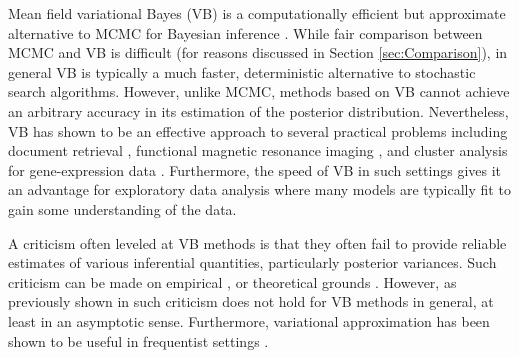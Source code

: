 \documentclass[11pt]{article}
\newtheorem{Main Result}{Main Result}
\newcommand{\joc}[1]{{\color{black}#1}}
\begin{document}
Mean field variational Bayes (VB) is \joc{a computationally efficient} but 
approximate alternative to MCMC for Bayesian inference 
\citep{Bishop2006,Ormerod2010}. While fair comparison between MCMC and VB is 
difficult (for reasons discussed in Section \ref{sec:Comparison}), in general VB 
is typically a much faster, deterministic alternative to stochastic search 
algorithms. However, unlike MCMC, methods based on VB cannot achieve an arbitrary 
accuracy \joc{in its estimation of the posterior distribution}. Nevertheless, VB 
has shown to be an effective approach to several practical problems including 
document retrieval \citep{Jordan2004}, functional magnetic resonance imaging 
\citep{FlandinPenny2007,NathooEtal2014}, and cluster analysis for 
gene-expression data \citep{TeschendorffEtal2005}. Furthermore, the speed of VB 
in such settings gives it an advantage for exploratory data analysis where many 
models are typically fit to gain some understanding of the data.


A criticism often leveled at VB methods is that they often fail to provide 
reliable estimates of various \joc{inferential quantities, particularly 
posterior variances}. Such criticism can be made on empirical \citep{WandEtal2011,Carbonetto2011}, or theoretical grounds 
\citep{WangTitterington:2006,rue2009}. However, as previously shown in 
\cite{You2014} such criticism does not hold for VB methods in general, at least 
in an asymptotic sense. Furthermore, variational approximation has been shown 
to be useful in frequentist settings \citep{HallEtal2011a,HallEtal2011b}.



\end{document}
